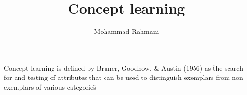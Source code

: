 \documentclass[a4paper]{article}
\title{Concept learning}
\date{}
\author{Mohammad Rahmani}
\begin{document}
    \maketitle
    Concept learning is defined by Bruner, Goodnow, \& Austin (1956) as \"the search for and testing of attributes that can be used to distinguish exemplars from non exemplars of various categories\" 
    
    
\end{document}
